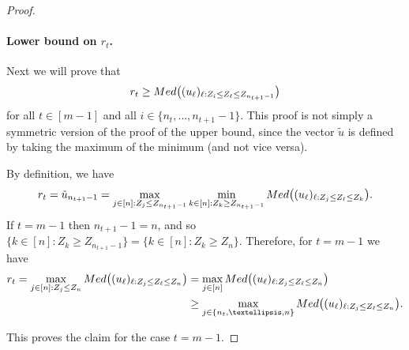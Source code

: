 \documentclass[12pt]{article}
\begin{document}
\begin{proof}
    \paragraph{Lower bound on $r_t$.}
    Next we will prove that
    \begin{equation}\label{eq:cumulative-median-inequalities-2}
    r_t\geq  \textnormal{Med}\bigl((u_\ell)_{\ell:Z_i\leq Z_\ell\leq Z_{n_{t+1}-1}}\bigr)
\end{equation}
for all $t\in[m-1]$ and all $i\in\{n_t,\dots,n_{t+1}-1\}$. This proof is not simply a symmetric version of the proof of the upper bound, since the vector $\tilde{u}$ is defined by taking the maximum of the minimum (and not vice versa).

By definition, we have 
\[r_t = \tilde{u}_{n_{t+1}-1} = \max_{j\in [n]: Z_j\leq Z_{n_{t+1}-1}}\min_{k\in [n]: Z_k\geq Z_{n_{t+1}-1}} \textnormal{Med}\bigl((u_\ell)_{\ell:Z_j\leq Z_\ell\leq Z_k}\bigr).\]
If $t=m-1$ then $n_{t+1}-1=n$, and so $\{k\in[n] : Z_k \geq Z_{n_{t+1}-1}\} = \{k\in[n]: Z_k \geq Z_n\}$. Therefore, for $t=m-1$ we have
\begin{align*}
r_t = \max_{j\in [n]: Z_j\leq Z_n}\textnormal{Med}\bigl((u_\ell)_{\ell:Z_j\leq Z_\ell\leq Z_n}\bigr) &= \max_{j \in [n]} \textnormal{Med}\bigl((u_\ell)_{\ell:Z_j\leq Z_\ell\leq Z_n}\bigr) \\
&\geq \max_{j \in\{n_t,\dots,n\}}\textnormal{Med}\bigl((u_\ell)_{\ell:Z_j\leq Z_\ell\leq Z_{n}}\bigr).
\end{align*}

This proves the claim for the case $t=m-1$.


\end{proof}
\end{document}
